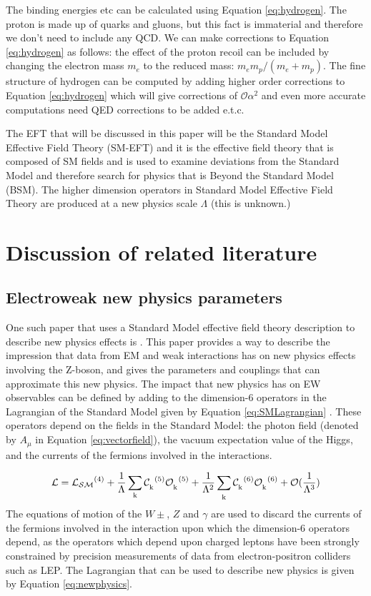 \documentclass[11pt,oneside,a4paper]{article}
\begin{document}
The binding energies etc can be calculated using Equation \ref{eq:hydrogen}. The proton is made up of quarks and gluons, but this fact is immaterial and therefore we don't need to include any QCD. We can make corrections to Equation \ref{eq:hydrogen} as follows: the effect of the proton recoil can be included by changing the electron mass $m_{e}$ to the reduced mass: $m_{e}m_{p}/(m_{e} + m_{p})$. The fine structure of hydrogen can be computed by adding higher order corrections to Equation \ref{eq:hydrogen} which will give corrections of $\mathcal{O}\alpha^2$ and even more accurate computations need QED corrections to be added e.t.c.

The EFT that will be discussed in this paper will be the Standard Model Effective Field Theory (SM-EFT) and it is the effective field theory that is composed of SM fields and is used to examine deviations from the Standard Model and therefore search for physics that is Beyond the Standard Model (BSM). The higher dimension operators in Standard Model Effective Field Theory are produced at a new physics scale $\Lambda$ (this is unknown.)

\section{Discussion of related literature}

\subsection{Electroweak new physics parameters}
One such paper that uses a Standard Model effective field theory description to describe new physics effects is \cite{EWprecision}. This paper provides a way to describe the impression that data from EM and weak interactions has on new physics effects involving the Z-boson, and gives the parameters and couplings that can approximate this new physics. The impact that new physics has on EW observables can be defined by adding to the dimension-6 operators in the Lagrangian of the Standard Model given by Equation \ref{eq:SMLagrangian} \cite{SMlagrangian}. These operators depend on the fields in the Standard Model: the photon field (denoted by $A_{\mu}$ in Equation \ref{eq:vectorfield}), the vacuum expectation value of the Higgs, and the currents of the fermions involved in the interactions.

\begin{equation}
\label{eq:SMLagrangian}
\mathrm{\mathcal{L} = \mathcal{L_{SM}}^{(4)} + \frac{1}{\Lambda}\sum_{k}^{}\mathcal{C_\textsubscript{k}}^{(5)}\mathcal{O_\textsubscript{k}}^{(5)}+\frac{1}{\Lambda^{2}}\sum_\textsubscript{k}^{}\mathcal{C_\textsubscript{k}}^{(6)}\mathcal{O_\textsubscript{k}}^{(6)}+\mathcal{O}(\frac{1}{\Lambda^{3}})}
\end{equation}
The equations of motion of the $W{\pm}$, $Z$ and $\gamma$ are used to discard the currents of the fermions involved in the interaction upon which the dimension-6 operators depend, as the operators which depend upon charged leptons have been strongly constrained by precision measurements of data from electron-positron colliders such as LEP. The Lagrangian that can be used to describe new physics is given by Equation \ref{eq:newphysics}. \cite{EWprecision}
\end{document}
